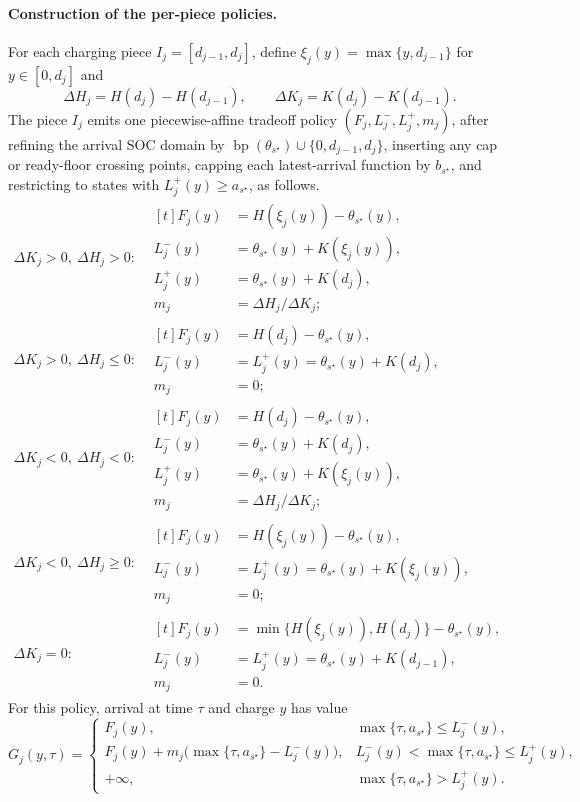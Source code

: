 \documentclass[review,3p,authoryear]{elsarticle}
\theoremstyle{plain}
\theoremstyle{definition}
\theoremstyle{remark}
\newcommand{\bp}{\operatorname{bp}}
\begin{document}
\paragraph{Construction of the per-piece policies.}
For each charging piece
$I_j=[d_{j-1},d_j]$, define
\(\xi_j(y)=\max\{y,d_{j-1}\}\) for \(y\in[0,d_j]\) and
\[
\Delta H_j=H(d_j)-H(d_{j-1}),\qquad
\Delta K_j=K(d_j)-K(d_{j-1}).
\]
The piece $I_j$ emits one
piecewise-affine tradeoff policy $(F_j,L_j^-,L_j^+,m_j)$, after refining the arrival
SOC domain by $\bp(\theta_{s^\star})\cup\{0,d_{j-1},d_j\}$, inserting any cap or
ready-floor crossing points, capping each latest-arrival function by $b_{s^\star}$,
and restricting to states with \(L_j^+(y)\ge a_{s^\star}\), as follows.
\[
\begin{array}{ll}
\Delta K_j>0,\ \Delta H_j>0:&
\begin{aligned}[t]
F_j(y)&=H(\xi_j(y))-\theta_{s^\star}(y),\\
L_j^-(y)&=\theta_{s^\star}(y)+K(\xi_j(y)),\\
L_j^+(y)&=\theta_{s^\star}(y)+K(d_j),\\
m_j&=\Delta H_j/\Delta K_j;
\end{aligned}\\[2mm]
\Delta K_j>0,\ \Delta H_j\le0:&
\begin{aligned}[t]
F_j(y)&=H(d_j)-\theta_{s^\star}(y),\\
L_j^-(y)&=L_j^+(y)=\theta_{s^\star}(y)+K(d_j),\\
m_j&=0;
\end{aligned}\\[2mm]
\Delta K_j<0,\ \Delta H_j<0:&
\begin{aligned}[t]
F_j(y)&=H(d_j)-\theta_{s^\star}(y),\\
L_j^-(y)&=\theta_{s^\star}(y)+K(d_j),\\
L_j^+(y)&=\theta_{s^\star}(y)+K(\xi_j(y)),\\
m_j&=\Delta H_j/\Delta K_j;
\end{aligned}\\[2mm]
\Delta K_j<0,\ \Delta H_j\ge0:&
\begin{aligned}[t]
F_j(y)&=H(\xi_j(y))-\theta_{s^\star}(y),\\
L_j^-(y)&=L_j^+(y)=\theta_{s^\star}(y)+K(\xi_j(y)),\\
m_j&=0;
\end{aligned}\\[2mm]
\Delta K_j=0:&
\begin{aligned}[t]
F_j(y)&=\min\{H(\xi_j(y)),H(d_j)\}-\theta_{s^\star}(y),\\
L_j^-(y)&=L_j^+(y)=\theta_{s^\star}(y)+K(d_{j-1}),\\
m_j&=0.
\end{aligned}
\end{array}
\]
For this policy, arrival at time \(\tau\) and charge \(y\) has value
\[
G_j(y,\tau)=
\begin{cases}
F_j(y), & \max\{\tau,a_{s^\star}\}\le L_j^-(y),\\
F_j(y)+m_j\bigl(\max\{\tau,a_{s^\star}\}-L_j^-(y)\bigr),
 & L_j^-(y)<\max\{\tau,a_{s^\star}\}\le L_j^+(y),\\
+\infty, & \max\{\tau,a_{s^\star}\}>L_j^+(y).
\end{cases}
\]
\end{document}
